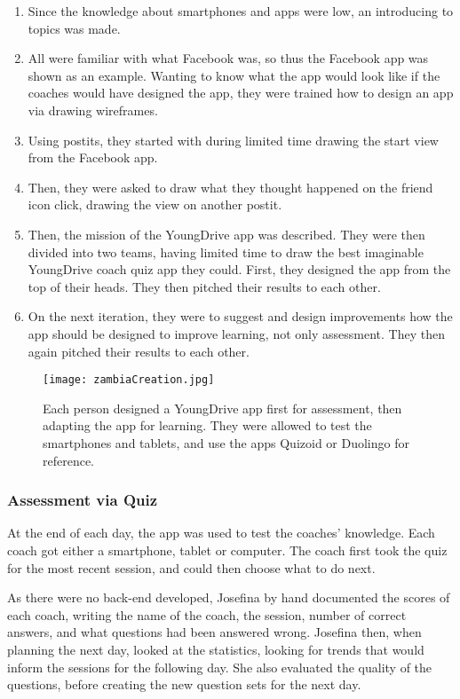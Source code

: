 \begin{enumerate}
\item Since the knowledge about smartphones and apps were low, an introducing to topics was made.
\item All were familiar with what Facebook was, so thus the Facebook app was shown as an example. Wanting to know what the app would look like if the coaches would have designed the app, they were trained how to design an app via drawing wireframes.
\item Using postits, they started with during limited time drawing the start view from the Facebook app.
\item Then, they were asked to draw what they thought happened on the friend icon click, drawing the view on another postit.
\item Then, the mission of the YoungDrive app was described. They were then divided into two teams, having limited time to draw the best imaginable YoungDrive coach quiz app they could. First, they designed the app from the top of their heads. They then pitched their results to each other.
\item On the next iteration, they were to suggest and design improvements how the app should be designed to improve learning, not only assessment. They then again pitched their results to each other.
\end{enumerate}

\begin{figure}[h]
    \centering
    \texttt{[image: zambiaCreation.jpg]}
    \caption{Each person designed a YoungDrive app first for assessment, then adapting the app for learning. They were allowed to test the smartphones and tablets, and use the apps Quizoid or Duolingo for reference.}
    \label{fig:zambia}
\end{figure}

\subsubsection{Assessment via Quiz}
At the end of each day, the app was used to test the coaches' knowledge. Each coach got either a smartphone, tablet or computer. The coach first took the quiz for the most recent session, and could then choose what to do next.

As there were no back-end developed, Josefina by hand documented the scores of each coach, writing the name of the coach, the session, number of correct answers, and what questions had been answered wrong. Josefina then, when planning the next day, looked at the statistics, looking for trends that would inform the sessions for the following day. She also evaluated the quality of the questions, before creating the new question sets for the next day.

